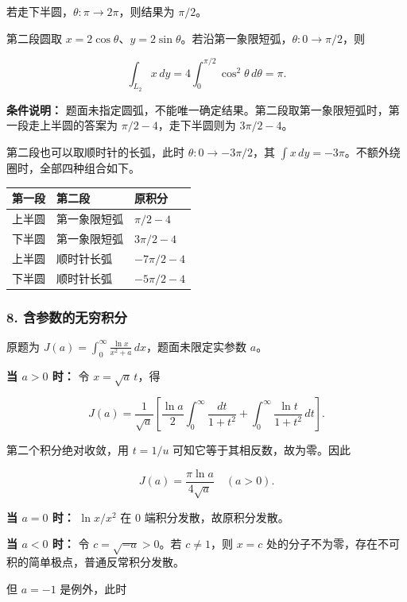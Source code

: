 \documentclass[11pt,fontset=fandol]{ctexart}
\newcounter{none}
\begin{document}
若走下半圆，\(\theta:\pi\to2\pi\)，则结果为 \(\pi/2\)。

第二段圆取
\(x=2\cos\theta\)、\(y=2\sin\theta\)。若沿第一象限短弧，\(\theta:0\to\pi/2\)，则

\[
\int_{L_2}x\,dy=4\int_0^{\pi/2}\cos^2\theta\,d\theta=\pi.
\]

\textbf{条件说明：}
题面未指定圆弧，不能唯一确定结果。第二段取第一象限短弧时，第一段走上半圆的答案为
\(\boxed{\pi/2-4}\)，走下半圆则为 \(\boxed{3\pi/2-4}\)。

第二段也可以取顺时针的长弧，此时 \(\theta:0\to-3\pi/2\)，其
\(\int x\,dy=-3\pi\)。不额外绕圈时，全部四种组合如下。

{\def\LTcaptype{none} %
\begin{longtable}[]{@{}lll@{}}
\toprule\noalign{}
第一段 & 第二段 & 原积分 \\
\midrule\noalign{}
\endhead
\bottomrule\noalign{}
\endlastfoot
上半圆 & 第一象限短弧 & \(\pi/2-4\) \\
下半圆 & 第一象限短弧 & \(3\pi/2-4\) \\
上半圆 & 顺时针长弧 & \(-7\pi/2-4\) \\
下半圆 & 顺时针长弧 & \(-5\pi/2-4\) \\
\end{longtable}
}

\subsubsection{8.
含参数的无穷积分}\label{ux542bux53c2ux6570ux7684ux65e0ux7a77ux79efux5206}

原题为
\(\displaystyle J(a)=\int_0^\infty\frac{\ln x}{x^2+a}\,dx\)，题面未限定实参数
\(a\)。

\textbf{当 \(a>0\) 时：} 令 \(x=\sqrt a\,t\)，得

\[
J(a)=\frac1{\sqrt a}\left[
\frac{\ln a}{2}\int_0^\infty\frac{dt}{1+t^2}
+\int_0^\infty\frac{\ln t}{1+t^2}\,dt\right].
\]

第二个积分绝对收敛，用 \(t=1/u\) 可知它等于其相反数，故为零。因此

\[
\boxed{J(a)=\frac{\pi\ln a}{4\sqrt a}\quad(a>0)}.
\]

\textbf{当 \(a=0\) 时：} \(\ln x/x^2\) 在 \(0\)
端积分发散，故原积分发散。

\textbf{当 \(a<0\) 时：} 令 \(c=\sqrt{-a}>0\)。若 \(c\ne1\)，则 \(x=c\)
处的分子不为零，存在不可积的简单极点，普通反常积分发散。

但 \(a=-1\) 是例外，此时
\end{document}
